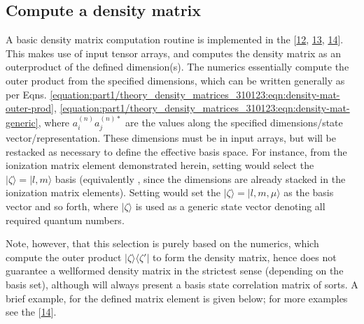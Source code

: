 \documentclass[letterpaper,table,10pt,english]{jupyterBook}
\begin{document}
\subsection{Compute a density matrix}
\label{\detokenize{part1/theory_density_matrices_310123:compute-a-density-matrix}}
\sphinxAtStartPar
A basic density matrix computation routine is implemented in the  {[}\hyperlink{cite.backmatter/bibliography:id561}{12}, \hyperlink{cite.backmatter/bibliography:id508}{13}, \hyperlink{cite.backmatter/bibliography:id506}{14}{]}. This makes use of input tensor arrays, and computes the density matrix as an outer\sphinxhyphen{}product of the defined dimension(s). The numerics essentially compute the outer product from the specified dimensions, which can be written generally as per Eqns. \eqref{equation:part1/theory_density_matrices_310123:eqn:density-mat-outer-prod}, \eqref{equation:part1/theory_density_matrices_310123:eqn:density-mat-generic}, where \(a_{i}^{(n)}a_{j}^{(n)*}\) are the values along the specified dimensions/state vector/representation. These dimensions must be in input arrays, but will be restacked as necessary to define the effective basis space. For instance, from the ionization matrix element demonstrated herein, setting \sphinxcode{\sphinxupquote{{[}l,m{]}}} would select the \(|\zeta\rangle = |l,m\rangle\) basis (equivalently , since the dimensions are already stacked in the ionization matrix elements). Setting \sphinxcode{\sphinxupquote{{[}'LM','mu'{]}}} would set the \(|\zeta\rangle = |l,m,\mu\rangle\) as the basis vector and so forth, where \(|\zeta\rangle\) is used as a generic state vector denoting all required quantum numbers.

\sphinxAtStartPar
Note, however, that this selection is purely based on the numerics, which compute the outer product \(|\zeta\rangle\langle\zeta'|\) to form the density matrix, hence does not guarantee a well\sphinxhyphen{}formed density matrix in the strictest sense (depending on the basis set), although will always present a basis state correlation matrix of sorts. A brief example, for the  defined matrix element is given below; for more examples see the  {[}\hyperlink{cite.backmatter/bibliography:id506}{14}{]}.
\end{document}

